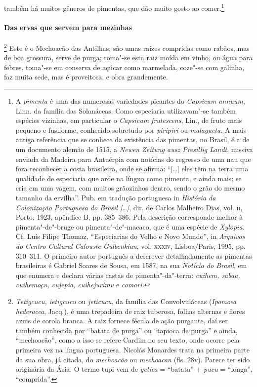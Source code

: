 também há muitos gêneros de pimentas, que dão muito gosto ao 
comer.\footnote{ A \textit{pimenta} é uma das numerosas variedades picantes
do \textit{Capsicum annuum}, Linn. da família das Solanáceas. Como
especiaria utilizavam"-se também espécies vizinhas, em particular o
\textit{Capsicum frutescens}, Lin., de fruto mais pequeno e fusiforme,
conhecido sobretudo por \textit{piripiri} ou \textit{malagueta.} A mais
antiga referência que se conhece da existência das pimentas, no
Brasil, é a de um documento alemão de 1515, a \textit{Newen Zeitung
ausz Presillig Landt}, missiva enviada da Madeira para Antuérpia com
notícias do regresso de uma nau que fora reconhecer a costa brasileira,
onde se afirma: ``[\ldots{}] eles têm na terra uma qualidade de especiaria
que arde na língua como pimenta, e ainda mais; se cria em uma vagem,
com muitos grãozinhos dentro, sendo o grão do mesmo tamanho da
ervilha''. Pub. em tradução portuguesa in \textit{História da
Colonização Portuguesa do Brasil [\ldots{}]}, dir. de Carlos Malheiro Dias,
vol. \textsc{ii}, Porto, 1923, apêndice B, pp. 385--386. Pela descrição
corresponde melhor à pimenta"-de"-bruge ou pimenta"-de"-macaco, que é uma
espécie de \textit{Xylopia.} Cf. Luís Filipe Thomaz, ``Especiarias do
Velho e Novo Mundo'', in \textit{Arquivos do Centro Cultural Calouste
Gulbenkian}, vol. \textsc{xxxiv}, Lisboa/Paris, 1995, pp. 310--311. O primeiro
autor português a descrever detalhadamente as pimentas brasileiras é
Gabriel Soares de Sousa, em 1587, na sua \textit{Notícia do Brasil}, 
em que enumera e declara várias castas de pimenta"-da"-terra:
\textit{cuihem, sabaa, cuihemoçu, cujepia, cuihejurimu} e \textit{comari.}} 

\paragraph{Das ervas que servem para mezinhas}

\footnote{ \textit{Tetigcucu, ietigcucu} ou
\textit{jeticucu}, da família das Convolvuláceas (\textit{Ipomoea
hederacea}, Jacq.), é uma trepadeira de raiz tuberosa, folhas alternas e
flores azuis de corola branca. A raiz fornece fécula de ação purgante,
daí ser também conhecida por ``batata de purga'' ou ``tapioca de purga'' e
ainda, ``mechoacão'', como a isso se refere Cardim no seu texto, onde
ocorre pela primeira vez na língua portuguesa. Nicolás Monardes trata
na primeira parte da sua obra, já citada, do \textit{mechoacão} ou
\textit{mechoacan} (fls. 28v). Parece ter sido originária da Ásia. O
termo tupi vem de \textit{yetica} = ``batata'' + \textit{pucu} = ``longa'',
``comprida''.} Este é o Mechoacão das Antilhas; são umas
raízes compridas como rabãos, mas de boa grossura, serve de purga;
toma"-se esta raiz moída em vinho, ou água para febres, toma"-se em
conserva de açúcar como marmelada, coze"-se com galinha, faz muita sede,
mas é proveitosa, e obra grandemente.

